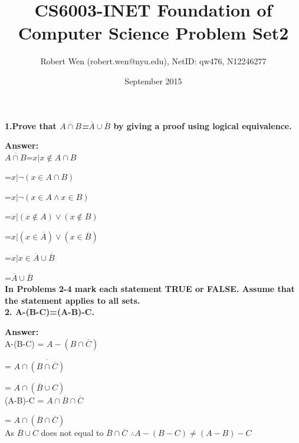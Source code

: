 \documentclass{article}
\title{CS6003-INET Foundation of Computer Science Problem Set2}
\author{Robert Wen (robert.wen@nyu.edu), NetID: qw476, N12246277}
\date{September 2015}
\begin{document}
\begin{large}

\maketitle



\textbf{1.Prove that \emph{$\overline{A\cap B}$=$\overline{A} \cup \overline{B}$} by giving a proof using logical equivalence.}

\textbf{Answer:} \\

\indent\indent\indent		     $\overline{A\cap B}$=${x|x \notin A\cap B}$

\indent\indent\indent                 =${x|\lnot(x \in A\cap B)}$
                    
\indent\indent\indent                 =${x|\lnot(x \in A \land x \in B)}$
                    
\indent\indent\indent                 =${x|(x \notin A) \lor (x \notin B)}$
                    
\indent\indent\indent                 =${x|(x \in \overline{A}) \lor (x \in \overline{B})}$
                    
\indent\indent\indent                 =${x|x \in \overline{A} \cup \overline{B}}$
                    
\indent\indent\indent                 =$\overline{A} \cup \overline{B}$\\

\textbf{In Problems 2-4 mark each statement TRUE or FALSE. Assume that the statement applies to all sets.} \\

\textbf{2. A-(B-C)=(A-B)-C.}

\textbf{Answer:} \\

A-(B-C) = $A-(B \cap \overline{C})$

        = $A \cap \overline{(B \cap \overline{C})}$
        
        = $A \cap (\overline{B} \cup C)$\\

(A-B)-C = $A \cap \overline{B} \cap \overline{C}$

        = $A \cap (\overline{B} \cap \overline{C})$\\

As $\overline{B} \cup C$ does not equal to $\overline{B} \cap \overline{C}$
$\therefore A-(B-C) \neq (A-B)-C$\\


\end{large}
\end{document}

